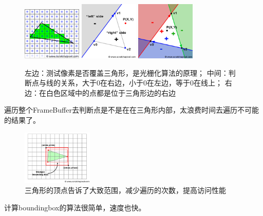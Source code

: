 \begin{figure}[h]
    \centering
    \includegraphics[width=0.25\textwidth]{images/rasterization-triangle1}
    \hspace{0.1cm}
    \includegraphics[width=0.25\textwidth]{images/rasterization-triangle2}
    \hspace{0.1cm}
    \includegraphics[width=0.25\textwidth]{images/rasterization-triangle3}
    \caption{左边：测试像素是否覆盖三角形，是光栅化算法的原理；
    中间：判断点与线的关系，大于0在右边，小于0在左边，等于0在线上；
    右边：在白色区域中的点都是位于三角形边的右边
    }    
\end{figure}
遍历整个FrameBuffer去判断点是不是在在三角形内部，太浪费时间去遍历不可能的结果了。
\begin{figure}[h]
    \centering
    \includegraphics[width=0.3\textwidth]{images/rasterization-boundingbox.png}
    \caption {三角形的顶点告诉了大致范围，减少遍历的次数，提高访问性能}
\end{figure}
计算boundingbox的算法很简单，速度也快。

